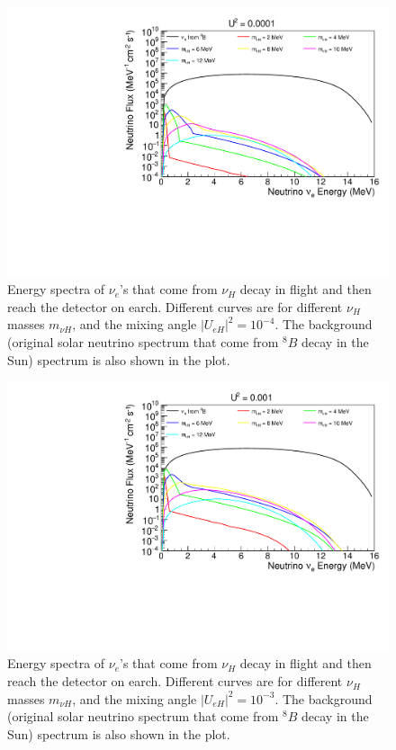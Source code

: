 \documentclass[%
 reprint,
 amsmath,amssymb,
 aps,
 prd,
twocolumn,
]{revtex4-1}
\begin{document}
\begin{figure}[!ht]
\includegraphics[width=0.99\columnwidth]{../plots/DecayInFlightNuLEnergy_U0.0001_AllMass_linXlogY.pdf}
\caption{Energy spectra of $\nu_e$'s that come from $\nu_H$ decay in flight and then reach the detector on earch. Different curves are for different $\nu_H$ masses $m_{\nu H}$, and the mixing angle $|U_{eH}|^2 = 10^{-4}$. 
The background (original solar neutrino spectrum that come from $^8 B$ decay in the Sun) spectrum is also shown in the plot.}
\label{fig:DecayInFlightSpectrum_U1em4_AllMass}
\end{figure}

\begin{figure}[!ht]
\includegraphics[width=0.99\columnwidth]{../plots/DecayInFlightNuLEnergy_U0.001_AllMass_linXlogY.pdf}
\caption{Energy spectra of $\nu_e$'s that come from $\nu_H$ decay in flight and then reach the detector on earch. Different curves are for different $\nu_H$ masses $m_{\nu H}$, and the mixing angle $|U_{eH}|^2 = 10^{-3}$. 
The background (original solar neutrino spectrum that come from $^8 B$ decay in the Sun) spectrum is also shown in the plot.}
\label{fig:DecayInFlightSpectrum_U1em3_AllMass}
\end{figure}
\end{document}

